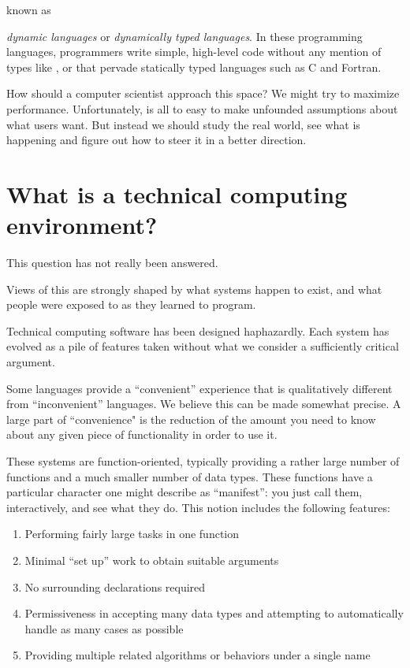 known as { {\it dynamic languages} or {\it dynamically typed languages}.
In these programming
languages, programmers write simple, high-level code without any
mention of types like ,  or  that
pervade statically typed languages such as C and Fortran.


How should a computer scientist approach this space? We might try to
maximize performance. Unfortunately,  is all to easy to make unfounded assumptions about
what users want. But instead we should study the real world, see
what is happening and figure out how to steer it in a better direction.


\section{What is a technical computing environment?}

This question has not really been answered.

Views of this are strongly shaped by what systems happen to exist,
and what people were exposed to as they learned to program.

Technical computing software has been designed haphazardly. Each system
has evolved as a pile of features taken without what we consider
a sufficiently critical argument.

Some languages provide a ``convenient'' experience that is
qualitatively different from ``inconvenient'' languages. We believe
this can be made somewhat precise. A large part of ``convenience"  is  the reduction of the
amount you need to know about any given piece of functionality in order
to use it.

These systems are function-oriented, typically providing a rather
large number of functions and a much smaller number of data types.
These functions have a particular
character one might describe as ``manifest'': you just call them,
interactively, and see what they do. This notion includes the
following features:

\vspace{-3ex}
\begin{singlespace}
\begin{enumerate}
\item Performing fairly large tasks in one function
\item Minimal ``set up'' work to obtain suitable arguments
\item No surrounding declarations required
\item Permissiveness in accepting many data types and attempting to
      automatically handle as many cases as possible
\item Providing multiple related algorithms or behaviors under a single name
\end{enumerate}
\end{singlespace}

}
